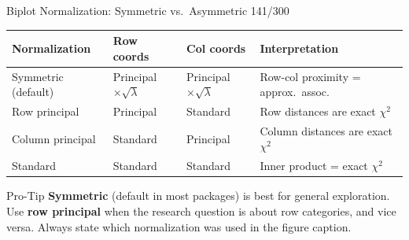 \documentclass[10pt]{beamer}
\newcommand{\smark}[1]{\hfill{\scriptsize\color{codegray}#1}}
\begin{document}
\begin{frame}{Biplot Normalization: Symmetric vs.\ Asymmetric}
\smark{141/300}
\centering\small
\begin{tabular}{@{}llll@{}}
    \toprule
    \textbf{Normalization} & \textbf{Row coords} & \textbf{Col coords} & \textbf{Interpretation} \\
    \midrule
    Symmetric (default)     & Principal $\times \sqrt{\lambda}$ & Principal $\times \sqrt{\lambda}$ & Row-col proximity = approx.\ assoc. \\
    Row principal           & Principal                 & Standard               & Row distances are exact $\chi^2$ \\
    Column principal        & Standard                  & Principal               & Column distances are exact $\chi^2$ \\
    Standard                & Standard                  & Standard               & Inner product = exact $\chi^2$ \\
    \bottomrule
\end{tabular}

\vspace{0.3cm}
\begin{alertblock}{Pro-Tip}
    \scriptsize \textbf{Symmetric} (default in most packages) is best for general exploration. Use \textbf{row principal} when the research question is about row categories, and vice versa. Always state which normalization was used in the figure caption.
\end{alertblock}
\end{frame}
\end{document}
